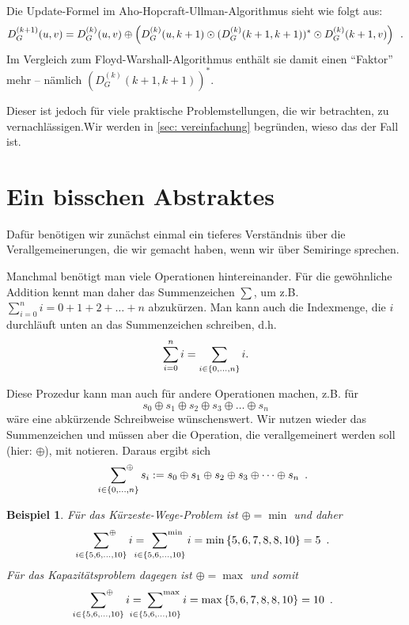 \documentclass[ngerman, a4paper, 12pt]{article}
\newcommand{\satzende}{\enskip \text{.}}
\theoremstyle{mystyle}
\newtheorem{beispiel}[definition]{Beispiel}
\begin{document}
	Die Update-Formel im Aho-Hopcraft-Ullman-Algorithmus sieht wie folgt aus:
	\begin{equation*}
		D_G^{(k+1)}(u,v) 
		= D_G^{(k)}(u,v) \oplus \brackets{D_G^{(k)}(u,k+1) \odot (D_G^{(k)}(k+1,k+1))^\ast \odot D_G^{(k)}(k+1,v)} \satzende
	\end{equation*}
	Im Vergleich zum Floyd-Warshall-Algorithmus enthält sie damit einen \enquote{Faktor} mehr -- nämlich $(D_G^{(k)}(k+1,k+1))^\ast$.
	
	Dieser ist jedoch für viele praktische Problemstellungen, die wir betrachten, zu vernachlässigen.Wir werden in \cref{sec: vereinfachung} begründen, wieso das der Fall ist. 
	
	\section{Ein bisschen Abstraktes}
	
	Dafür benötigen wir zunächst einmal ein tieferes Verständnis über die Verallgemeinerungen, die wir gemacht haben, wenn wir über Semiringe sprechen.

	Manchmal benötigt man viele Operationen hintereinander. Für die gewöhnliche Addition kennt man daher das Summenzeichen $\sum$, um z.B. $\sum_{i=0}^n i = 0 + 1 + 2 + \dots + n$ abzukürzen. Man kann auch die Indexmenge, die $i$ durchläuft unten an das Summenzeichen schreiben, d.h.
	\begin{equation*}
		\sum_{i=0}^n i = \sum_{i \in \left\{ 0, \dots, n \right\}} i.
	\end{equation*}
	
	Diese Prozedur kann man auch für andere Operationen machen, z.B. für 
	\begin{equation*}
		s_0 \oplus s_1 \oplus s_2 \oplus s_3 \oplus \dots  \oplus s_n
	\end{equation*}
	wäre eine abkürzende Schreibweise wünschenswert. Wir nutzen wieder das Summenzeichen und müssen aber die Operation, die verallgemeinert werden soll (hier: $\oplus$), mit notieren. Daraus ergibt sich
	\begin{equation*}
		\sideset{}{^\oplus}\sum_{i \in \menge{0, \dots, n}} s_i \defeq s_0 \oplus s_1 \oplus s_2 \oplus s_3 \oplus \dots  \oplus s_n
		\satzende
	\end{equation*}

	\begin{beispiel}
		Für das Kürzeste-Wege-Problem ist $\oplus = \min$ und daher
		\begin{equation*}
			\sideset{}{^\oplus}\sum_{i \in \menge{5, 6, \dots, 10}} i
			 = \sideset{}{^{\min}}\sum_{i \in \menge{5, 6, \dots, 10}} i
			= \min\menge{5, 6, 7, 8, 8, 10} = 5
			\satzende
		\end{equation*}
		Für das Kapazitätsproblem dagegen ist $\oplus = \max$ und somit
		\begin{equation*}
			\sideset{}{^\oplus}\sum_{i \in \menge{5, 6, \dots, 10}} i
			= \sideset{}{^{\max}}\sum_{i \in \menge{5, 6, \dots, 10}} i
			= \max\menge{5, 6, 7, 8, 8, 10} = 10
			\satzende
		\end{equation*}
	\end{beispiel}
	
\end{document}
